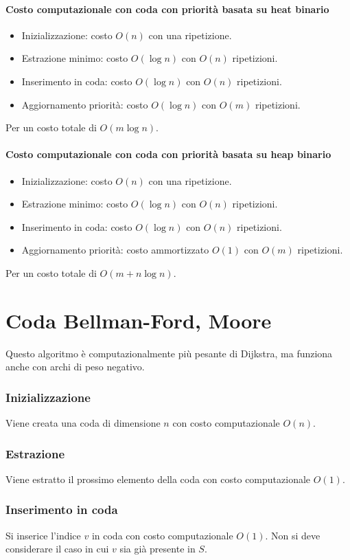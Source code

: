 \paragraph{Costo computazionale con coda con priorit\`a basata su heat binario}
\begin{itemize}
	\item Inizializzazione: costo $O(n)$ con una ripetizione.
	\item Estrazione minimo: costo $O(\log n)$ con $O(n)$ ripetizioni.
	\item Inserimento in coda: costo $O(\log n)$ con $O(n)$ ripetizioni.
	\item Aggiornamento priorit\`a: costo $O(\log n)$ con $O(m)$ ripetizioni.
\end{itemize}
Per un costo totale di $O(m\log n)$.
\paragraph{Costo computazionale con coda con priorit\`a basata su heap binario}
\begin{itemize}
	\item Inizializzazione: costo $O(n)$ con una ripetizione.
	\item Estrazione minimo: costo $O(\log n)$ con $O(n)$ ripetizioni.
	\item Inserimento in coda: costo $O(\log n)$ con $O(n)$ ripetizioni.
	\item Aggiornamento priorit\`a: costo ammortizzato $O(1)$ con $O(m)$ ripetizioni.
\end{itemize}
Per un costo totale di $O(m+n\log n)$.
\section{Coda Bellman-Ford, Moore}
Questo algoritmo \`e computazionalmente pi\`u pesante di Dijkstra, ma funziona anche con archi di peso negativo.
\subsubsection{Inizializzazione}
Viene creata una coda di dimensione $n$ con costo computazionale $O(n)$.
\subsubsection{Estrazione}
Viene estratto il prossimo elemento della coda con costo computazionale $O(1)$.
\subsubsection{Inserimento in coda}
Si inserice l'indice $v$ in coda con costo computazionale $O(1)$. Non si deve considerare il caso in cui $v$ sia gi\`a presente in $S$.
